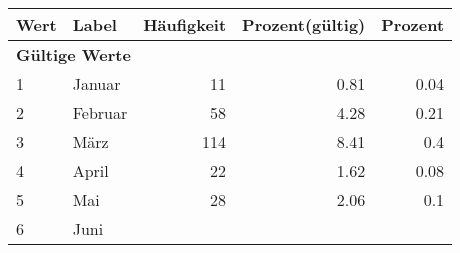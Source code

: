     \begin{longtable}{lXrrr}
     \toprule
     \textbf{Wert} & \textbf{Label} & \textbf{Häufigkeit} & \textbf{Prozent(gültig)} & \textbf{Prozent} \\
     \endhead
     \midrule
     \multicolumn{5}{l}{\textbf{Gültige Werte}}\\

     1 &
     \multicolumn{1}{X}{ Januar   } &


       \num{11} &
       \num[round-mode=places,round-precision=2]{0.81} &
         \num[round-mode=places,round-precision=2]{0.04} \\

     2 &
     \multicolumn{1}{X}{ Februar   } &


       \num{58} &
       \num[round-mode=places,round-precision=2]{4.28} &
         \num[round-mode=places,round-precision=2]{0.21} \\

     3 &
     \multicolumn{1}{X}{ März   } &


       \num{114} &
       \num[round-mode=places,round-precision=2]{8.41} &
         \num[round-mode=places,round-precision=2]{0.4} \\

     4 &
     \multicolumn{1}{X}{ April   } &


       \num{22} &
       \num[round-mode=places,round-precision=2]{1.62} &
         \num[round-mode=places,round-precision=2]{0.08} \\

     5 &
     \multicolumn{1}{X}{ Mai   } &


       \num{28} &
       \num[round-mode=places,round-precision=2]{2.06} &
         \num[round-mode=places,round-precision=2]{0.1} \\

     6 &
     \multicolumn{1}{X}{ Juni   } &



\end{longtable}
